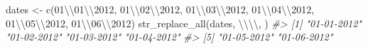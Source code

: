 \documentclass[
]{book}
\newenvironment{Shaded}{\begin{snugshade}}{\end{snugshade}}
\newcommand{\CommentTok}[1]{\textcolor[rgb]{0.56,0.35,0.01}{\textit{#1}}}
\newcommand{\FunctionTok}[1]{\textcolor[rgb]{0.00,0.00,0.00}{#1}}
\newcommand{\NormalTok}[1]{#1}
\newcommand{\OtherTok}[1]{\textcolor[rgb]{0.56,0.35,0.01}{#1}}
\newcommand{\SpecialCharTok}[1]{\textcolor[rgb]{0.00,0.00,0.00}{#1}}
\newcommand{\StringTok}[1]{\textcolor[rgb]{0.31,0.60,0.02}{#1}}
\begin{document}
\begin{Shaded}
\begin{Highlighting}[]
\NormalTok{dates }\OtherTok{\textless{}{-}} \FunctionTok{c}\NormalTok{(}\StringTok{\textquotesingle{}01}\SpecialCharTok{\textbackslash{}\textbackslash{}}\StringTok{01}\SpecialCharTok{\textbackslash{}\textbackslash{}}\StringTok{2012\textquotesingle{}}\NormalTok{, }\StringTok{\textquotesingle{}01}\SpecialCharTok{\textbackslash{}\textbackslash{}}\StringTok{02}\SpecialCharTok{\textbackslash{}\textbackslash{}}\StringTok{2012\textquotesingle{}}\NormalTok{, }\StringTok{\textquotesingle{}01}\SpecialCharTok{\textbackslash{}\textbackslash{}}\StringTok{03}\SpecialCharTok{\textbackslash{}\textbackslash{}}\StringTok{2012\textquotesingle{}}\NormalTok{, }\StringTok{\textquotesingle{}01}\SpecialCharTok{\textbackslash{}\textbackslash{}}\StringTok{04}\SpecialCharTok{\textbackslash{}\textbackslash{}}\StringTok{2012\textquotesingle{}}\NormalTok{, }\StringTok{\textquotesingle{}01}\SpecialCharTok{\textbackslash{}\textbackslash{}}\StringTok{05}\SpecialCharTok{\textbackslash{}\textbackslash{}}\StringTok{2012\textquotesingle{}}\NormalTok{, }\StringTok{\textquotesingle{}01}\SpecialCharTok{\textbackslash{}\textbackslash{}}\StringTok{06}\SpecialCharTok{\textbackslash{}\textbackslash{}}\StringTok{2012\textquotesingle{}}\NormalTok{)}
\FunctionTok{str\_replace\_all}\NormalTok{(dates, }\StringTok{\textquotesingle{}}\SpecialCharTok{\textbackslash{}\textbackslash{}\textbackslash{}\textbackslash{}}\StringTok{\textquotesingle{}}\NormalTok{, }\StringTok{\textquotesingle{}{-}\textquotesingle{}}\NormalTok{)}
\CommentTok{\#\textgreater{} [1] "01{-}01{-}2012" "01{-}02{-}2012" "01{-}03{-}2012" "01{-}04{-}2012"}
\CommentTok{\#\textgreater{} [5] "01{-}05{-}2012" "01{-}06{-}2012"}


\end{Highlighting}
\end{Shaded}
\end{document}
